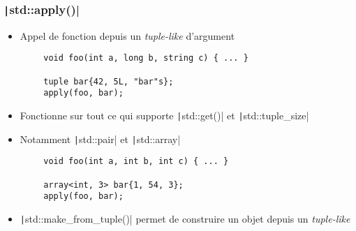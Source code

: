 \documentclass[C++.tex]{subfiles}
\begin{document}
\begin{frame}[fragile]
	\frametitle{\texttt|std::apply()|}
	\begin{itemize}
		\item Appel de fonction depuis un \textit{tuple-like} d'argument
	\end{itemize}

	\begin{verbatim}
		void foo(int a, long b, string c) { ... }

		tuple bar{42, 5L, "bar"s};
		apply(foo, bar);
	\end{verbatim}

	\begin{itemize}
		\item Fonctionne sur tout ce qui supporte \texttt|std::get()| et \texttt|std::tuple_size|
		\item Notamment \texttt|std::pair| et \texttt|std::array|
	\end{itemize}

	\begin{verbatim}
		void foo(int a, int b, int c) { ... }

		array<int, 3> bar{1, 54, 3};
		apply(foo, bar);
	\end{verbatim}

	\begin{itemize}
		\item \texttt|std::make_from_tuple()| permet de construire un objet depuis un \textit{tuple-like}
	\end{itemize}



\end{frame}
\end{document}
